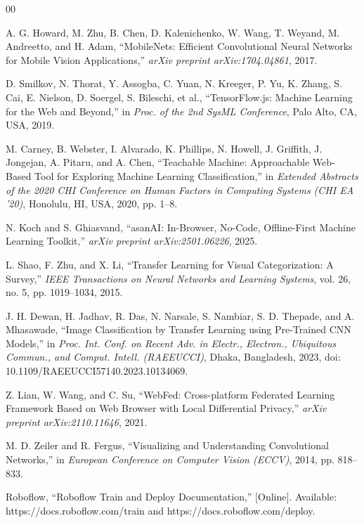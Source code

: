 \documentclass[conference]{IEEEtran}
\begin{document}
\begin{thebibliography}{00}

A. G. Howard, M. Zhu, B. Chen, D. Kalenichenko, W. Wang, T. Weyand, M. Andreetto, and H. Adam, ``MobileNets: Efficient Convolutional Neural Networks for Mobile Vision Applications,'' \textit{arXiv preprint arXiv:1704.04861}, 2017.

D. Smilkov, N. Thorat, Y. Assogba, C. Yuan, N. Kreeger, P. Yu, K. Zhang, S. Cai, E. Nielson, D. Soergel, S. Bileschi, et al., ``TensorFlow.js: Machine Learning for the Web and Beyond,'' in \textit{Proc. of the 2nd SysML Conference}, Palo Alto, CA, USA, 2019.

M. Carney, B. Webster, I. Alvarado, K. Phillips, N. Howell, J. Griffith, J. Jongejan, A. Pitaru, and A. Chen, ``Teachable Machine: Approachable Web-Based Tool for Exploring Machine Learning Classification,'' in \textit{Extended Abstracts of the 2020 CHI Conference on Human Factors in Computing Systems (CHI EA '20)}, Honolulu, HI, USA, 2020, pp. 1--8.

N. Koch and S. Ghiasvand, ``asanAI: In-Browser, No-Code, Offline-First Machine Learning Toolkit,'' \textit{arXiv preprint arXiv:2501.06226}, 2025.

L. Shao, F. Zhu, and X. Li, ``Transfer Learning for Visual Categorization: A Survey,'' \textit{IEEE Transactions on Neural Networks and Learning Systems}, vol. 26, no. 5, pp. 1019--1034, 2015.

J. H. Dewan, H. Jadhav, R. Das, N. Narsale, S. Nambiar, S. D. Thepade, and A. Mhasawade, ``Image Classification by Transfer Learning using Pre-Trained CNN Models,'' in \textit{Proc. Int. Conf. on Recent Adv. in Electr., Electron., Ubiquitous Commun., and Comput. Intell. (RAEEUCCI)}, Dhaka, Bangladesh, 2023, doi: 10.1109/RAEEUCCI57140.2023.10134069.

Z. Lian, W. Wang, and C. Su, ``WebFed: Cross-platform Federated Learning Framework Based on Web Browser with Local Differential Privacy,'' \textit{arXiv preprint arXiv:2110.11646}, 2021.

M. D. Zeiler and R. Fergus, ``Visualizing and Understanding Convolutional Networks,'' in \textit{European Conference on Computer Vision (ECCV)}, 2014, pp. 818--833.

Roboflow, ``Roboflow Train and Deploy Documentation,'' [Online]. Available: https://docs.roboflow.com/train and https://docs.roboflow.com/deploy.


\end{thebibliography}
\end{document}
